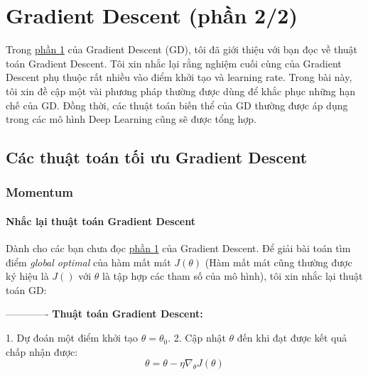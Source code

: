 \chapter{Gradient Descent (phần 2/2)}

 
Trong \href{http://machinelearningcoban.com/2017/01/12/gradientdescent/}{phần 1} của Gradient Descent (GD), tôi đã giới thiệu với bạn đọc về thuật toán Gradient Descent. Tôi xin nhắc lại rằng nghiệm cuối cùng của Gradient Descent phụ thuộc rất nhiều vào điểm khởi tạo và learning rate. Trong bài này, tôi xin đề cập một vài phương pháp thường được dùng để khắc phục những hạn chế của GD. Đồng thời, các thuật toán biến thể của GD thường được áp dụng trong các mô hình Deep Learning cũng sẽ được tổng hợp.  
 
 
\section{Các thuật toán tối ưu Gradient Descent}
 
 
\subsection{Momentum}
 
\subsubsection{Nhắc lại thuật toán Gradient Descent}
Dành cho các bạn chưa đọc \href{http://machinelearningcoban.com/2017/01/12/gradientdescent/}{phần 1} của Gradient Descent. Để giải bài toán tìm điểm \textit{global optimal} của hàm mất mát $J(\theta)$ (Hàm mất mát cũng thường được ký hiệu là $J()$ với $\theta$ là tập hợp các tham số của mô hình), tôi xin nhắc lại thuật toán GD: 
 
------------- 
\textbf{Thuật toán Gradient Descent:} 
 
1. Dự đoán một điểm khởi tạo $\theta = \theta_0$. 
2. Cập nhật $\theta$ đến khi đạt được kết quả chấp nhận được:  
\begin{equation*} 
\theta = \theta - \eta \nabla_{\theta}J(\theta) 
\end{equation*} 
 
